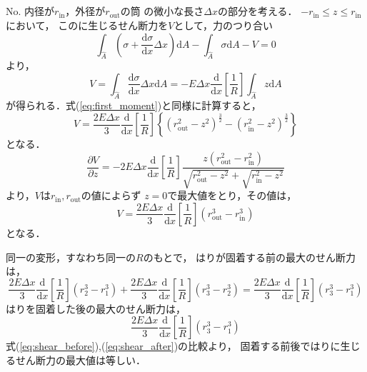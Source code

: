 \documentclass[a4paper]{jsarticle}
\begin{document}
\subsection{}
No.
内径が$r_{\mathrm{in}}$，外径が$r_{\mathrm{out}}$の筒
の微小な長さ$\Delta x$の部分を考える．
$-r_{\mathrm{in}} \leq z \leq r_{\mathrm{in}}$において，
このに生じるせん断力を$V$として，力のつり合い
\begin{equation}
  \int_{\hat{A}} \left(
  \sigma + \frac{\mathrm{d} \sigma}{\mathrm{d} x} \Delta x
  \right) \mathrm{d} A -
  \int_{\hat{A}} \sigma \mathrm{d} A
  - V = 0
\end{equation}
より，
\begin{equation}
  V  = \int_{\hat{A}} \frac{\mathrm{d} \sigma}{\mathrm{d} x}
  \Delta x \mathrm{d} A
  = -E \Delta x \frac{\mathrm{d}}{\mathrm{d} x}
  \left[\frac{1}{R}\right] \int_{\hat{A}} z \mathrm{d} A
\end{equation}
が得られる．式(\ref{eq:first_moment})と同様に計算すると，
\begin{equation}
  V = \frac{2 E \Delta x}{3} \frac{\mathrm{d}}{\mathrm{d} x}
  \left[\frac{1}{R}\right]
  \left\{(r_{\mathrm{out}}^2 - z^2)^{\frac{3}{2}}
  - (r_{\mathrm{in}}^2 - z^2)^{\frac{3}{2}}\right\}
\end{equation}
となる．
\begin{equation}
  \frac{\partial V}{\partial z} =
  -2 E \Delta x \frac{\mathrm{d}}{\mathrm{d} x}
  \left[\frac{1}{R}\right]
  \frac{z (r_{\mathrm{out}}^2 - r_{\mathrm{in}}^2)}
  {\sqrt{r_{\mathrm{out}}^2 - z^2} + \sqrt{r_{\mathrm{in}}^2 - z^2}}
\end{equation}
より，$V$は$r_{\mathrm{in}}, r_{\mathrm{out}}$の値によらず
$z = 0$で最大値をとり，その値は，
\begin{equation}
  V = \frac{2 E \Delta x}{3} \frac{\mathrm{d}}{\mathrm{d} x}
  \left[\frac{1}{R}\right] (r_{\mathrm{out}}^3 - r_{\mathrm{in}}^3)
\end{equation}
となる．\par
同一の変形，すなわち同一の$R$のもとで，
はりが固着する前の最大のせん断力は，
\begin{equation}
  \label{eq:shear_before}
  \frac{2 E \Delta x}{3} \frac{\mathrm{d}}{\mathrm{d} x}
  \left[\frac{1}{R}\right] (r_{2}^3 - r_{1}^3) +
  \frac{2 E \Delta x}{3} \frac{\mathrm{d}}{\mathrm{d} x}
  \left[\frac{1}{R}\right] (r_{3}^3 - r_{2}^3) =
  \frac{2 E \Delta x}{3} \frac{\mathrm{d}}{\mathrm{d} x}
  \left[\frac{1}{R}\right] (r_{3}^3 - r_{1}^3)
\end{equation}
はりを固着した後の最大のせん断力は，
\begin{equation}
  \label{eq:shear_after}
  \frac{2 E \Delta x}{3} \frac{\mathrm{d}}{\mathrm{d} x}
  \left[\frac{1}{R}\right] (r_{3}^3 - r_{1}^3)
\end{equation}
式(\ref{eq:shear_before}),(\ref{eq:shear_after})の比較より，
固着する前後ではりに生じるせん断力の最大値は等しい．
\end{document}
